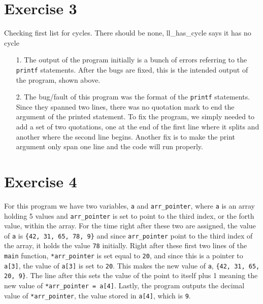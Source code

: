 \documentclass[12pt]{article}
\begin{document}
    \section*{Exercise 3}
    \begin{center}
        Checking first list for cycles. There should be none, ll\_has\_cycle
        says it has no cycle
    \end{center}
    \begin{itemize}
        \item[1.]
            The output of the program initially is a bunch of errors referring
            to the \verb+printf+ statements. After the bugs are fixed, this is
            the intended output of the program, shown above.
        \item[2.]
            The bug/fault of this program was the format of the \verb+printf+
            statements. Since they spanned two lines, there was no quotation
            mark to end the argument of the printed statement. To fix the
            program, we simply needed to add a set of two quotations, one at the
            end of the first line where it splits and another where the second
            line begins. Another fix is to make the print argument only span one
            line and the code will run properly.
    \end{itemize}
    \section*{Exercise 4}
    \par For this program we have two variables, \verb+a+ and
    \verb+arr_pointer+, where \verb+a+ is an array holding 5 values and
    \verb+arr_pointer+ is set to point to the third index, or the forth value,
    within the array. For the time right after these two are assigned, the
    value of
    \verb+a+ is \verb+{42, 31, 65, 78, 9}+ and since \verb+arr_pointer+ point to
    the third index of the array, it holds the value \verb+78+  initially. Right after
    these first two lines of the \verb+main+ function, \verb+*arr_pointer+ is
    set equal to \verb+20+, and since this is a pointer to \verb+a[3]+, the
    value of \verb+a[3]+ is set to \verb+20+. This makes the new value of
    \verb+a+, \verb+{42, 31, 65, 20, 9}+. The line after this sets the value of
    the point to itself plus 1 meaning the new value of \verb+*arr_pointer = a[4]+.
    Lastly, the program outputs the decimal value of \verb+*arr_pointer+, the
    value stored in \verb+a[4]+, which is \verb+9+.
\end{document}
